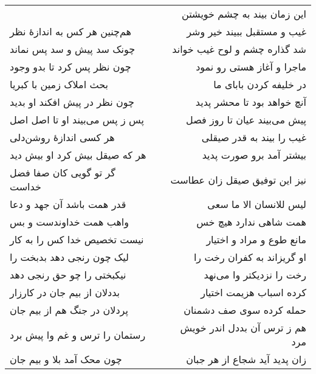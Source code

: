 \begin{center}
\begin{longtable}{l p{0.5cm} r}
&&
این زمان بیند به چشم خویشتن
\\
هم‌چنین هر کس به اندازهٔ نظر
&&
غیب و مستقبل ببیند خیر وشر
\\
چونک سد پیش و سد پس نماند
&&
شد گذاره چشم و لوح غیب خواند
\\
چون نظر پس کرد تا بدو وجود
&&
ماجرا و آغاز هستی رو نمود
\\
بحث املاک زمین با کبریا
&&
در خلیفه کردن بابای ما
\\
چون نظر در پیش افکند او بدید
&&
آنچ خواهد بود تا محشر پدید
\\
پس ز پس می‌بیند او تا اصل اصل
&&
پیش می‌بیند عیان تا روز فصل
\\
هر کسی اندازهٔ روشن‌دلی
&&
غیب را بیند به قدر صیقلی
\\
هر که صیقل بیش کرد او بیش دید
&&
بیشتر آمد برو صورت پدید
\\
گر تو گویی کان صفا فضل خداست
&&
نیز این توفیق صیقل زان عطاست
\\
قدر همت باشد آن جهد و دعا
&&
لیس للانسان الا ما سعی
\\
واهب همت خداوندست و بس
&&
همت شاهی ندارد هیچ خس
\\
نیست تخصیص خدا کس را به کار
&&
مانع طوع و مراد و اختیار
\\
لیک چون رنجی دهد بدبخت را
&&
او گریزاند به کفران رخت را
\\
نیکبختی را چو حق رنجی دهد
&&
رخت را نزدیکتر وا می‌نهد
\\
بددلان از بیم جان در کارزار
&&
کرده اسباب هزیمت اختیار
\\
پردلان در جنگ هم از بیم جان
&&
حمله کرده سوی صف دشمنان
\\
رستمان را ترس و غم وا پیش برد
&&
هم ز ترس آن بددل اندر خویش مرد
\\
چون محک آمد بلا و بیم جان
&&
زان پدید آید شجاع از هر جبان
\\
\end{longtable}
\end{center}
